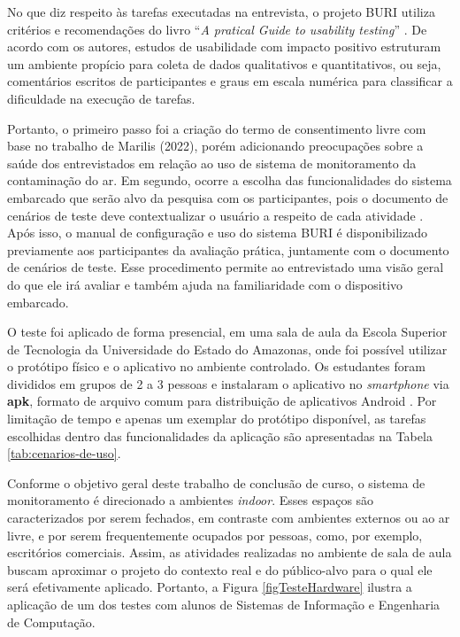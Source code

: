 No que diz respeito às tarefas executadas na entrevista, o projeto BURI utiliza critérios e 
recomendações do livro ``\textit{A pratical Guide to usability testing}'' \cite{tarefas-design}. De acordo com os autores, estudos 
de usabilidade com impacto positivo estruturam um ambiente propício para coleta de dados qualitativos e quantitativos, ou seja, comentários escritos de participantes e 
graus em escala numérica para classificar a dificuldade na execução de tarefas. 

Portanto, o primeiro passo foi a criação do termo de consentimento livre com base no trabalho de Marilis (2022), porém adicionando preocupações sobre a saúde dos entrevistados 
em relação ao uso de sistema de monitoramento da contaminação do ar. Em segundo, ocorre a escolha das funcionalidades do sistema embarcado que serão alvo da pesquisa com os participantes, pois 
o documento de cenários de teste deve contextualizar o usuário a respeito de cada atividade \cite{tarefas-design}. Após isso, o manual de configuração e uso do sistema BURI é disponibilizado 
previamente aos participantes da avaliação prática, juntamente com o documento de cenários de teste. Esse procedimento permite ao entrevistado uma visão geral do que ele irá avaliar e também 
ajuda na familiaridade com o dispositivo embarcado.

O teste foi aplicado de forma presencial, em uma sala de aula da Escola Superior de Tecnologia da Universidade do Estado do Amazonas, onde foi possível utilizar o protótipo físico
e o aplicativo no ambiente controlado. Os estudantes foram divididos em grupos de 2 a 3 pessoas e instalaram o 
aplicativo no \textit{smartphone} via \textbf{apk}, formato de arquivo comum para distribuição de aplicativos Android \cite{android-developers}. Por limitação de tempo e apenas um exemplar do protótipo disponível, as 
tarefas escolhidas dentro das funcionalidades da aplicação são apresentadas na Tabela \ref{tab:cenarios-de-uso}. 

Conforme o objetivo geral deste trabalho de conclusão de curso, o sistema de monitoramento é direcionado a ambientes \textit{indoor}. Esses espaços são 
caracterizados por serem fechados, em contraste com ambientes externos ou ao ar livre, e por serem frequentemente ocupados por pessoas, como, por exemplo, escritórios comerciais. Assim, as atividades realizadas no ambiente de sala de aula 
buscam aproximar o projeto do contexto real e do público-alvo para o qual ele será efetivamente aplicado. Portanto, a Figura \ref{figTesteHardware} ilustra a aplicação de um dos testes 
com alunos de Sistemas de Informação e Engenharia de Computação.

